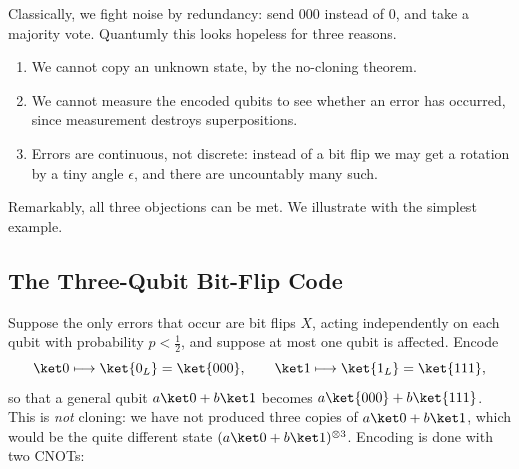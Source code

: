 Classically, we fight noise by redundancy: send $000$ instead of $0$, and take a majority vote. Quantumly this looks hopeless for three reasons.

\begin{enumerate}[label=(\roman*)]
	\item We cannot copy an unknown state, by the no-cloning theorem.
	\item We cannot measure the encoded qubits to see whether an error has occurred, since measurement destroys superpositions.
	\item Errors are continuous, not discrete: instead of a bit flip we may get a rotation by a tiny angle $\epsilon$, and there are uncountably many such.
\end{enumerate}

Remarkably, all three objections can be met. We illustrate with the simplest example.

\subsection{The Three-Qubit Bit-Flip Code}\label{sec:bitflip}

Suppose the only errors that occur are bit flips $X$, acting independently on each qubit with probability $p<\tfrac12$, and suppose at most one qubit is affected. Encode
$$\ket0\longmapsto\ket{0_L} = \ket{000}, \qquad \ket1\longmapsto\ket{1_L}=\ket{111},$$
so that a general qubit $a\ket0+b\ket1$ becomes $a\ket{000}+b\ket{111}$. This is \emph{not} cloning: we have not produced three copies of $a\ket0+b\ket1$, which would be the quite different state $(a\ket0+b\ket1)^{\otimes3}$. Encoding is done with two CNOTs:

\begin{center}
\end{center}

